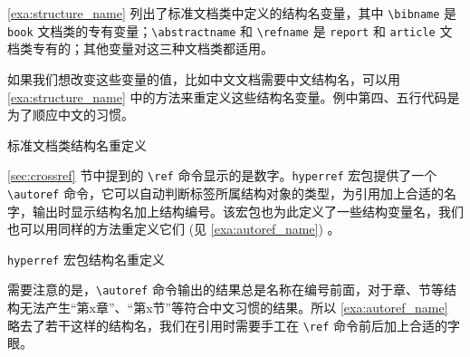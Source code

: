\autoref{exa:structure_name} 列出了标准文档类中定义的结构名变量，其中 \verb|\bibname| 是 \texttt{book} 文档类的专有变量；\verb|\abstractname| 和 \verb|\refname| 是 \texttt{report} 和 \texttt{article} 文档类专有的；其他变量对这三种文档类都适用。

如果我们想改变这些变量的值，比如中文文档需要中文结构名，可以用 \autoref{exa:structure_name} 中的方法来重定义这些结构名变量。例中第四、五行代码是为了顺应中文的习惯。

\begin{example}[htbp]
\begin{Code}[]
\renewcommand{\contentsname}{`目录`}
\renewcommand{\listfigurename}{`图目录`}
\renewcommand{\listtablename}{`表目录`}
\renewcommand{\partname}{`第` \thepart `部分`}
\renewcommand{\chaptername}{`第` \thechapter `章`}
\renewcommand{\figurename}{`图`}
\renewcommand{\tablename}{`表`}
\renewcommand{\bibname}{`参考文献`}
\renewcommand{\appendixname}{`附录`}
\renewcommand{\indexname}{`索引`}
\renewcommand{\abstractname}{`摘要`}
\renewcommand{\refname}{`参考文献`}
\end{Code}
\caption{标准文档类结构名重定义}
\label{exa:structure_name}
\end{example}

\ref{sec:crossref} 节中提到的 \verb|\ref| 命令显示的是数字。\texttt{hyperref} 宏包提供了一个 \verb|\autoref| 命令，它可以自动判断标签所属结构对象的类型，为引用加上合适的名字，输出时显示结构名加上结构编号。该宏包也为此定义了一些结构变量名，我们也可以用同样的方法重定义它们 (见 \autoref{exa:autoref_name}) 。

\begin{example}[htbp]
\begin{Code}[]
\renewcommand{\equationautorefname}{`公式`}
\renewcommand{\footnoteautorefname}{`脚注`}
\renewcommand{\itemautorefname}{`项`}
\renewcommand{\figureautorefname}{`图`}
\renewcommand{\tableautorefname}{`表`}
\renewcommand{\appendixautorefname}{`附录`}
\renewcommand{\theoremautorefname}{`定理`}
\end{Code}
\caption{\texttt{hyperref} 宏包结构名重定义}
\label{exa:autoref_name}
\end{example}

需要注意的是，\verb|\autoref| 命令输出的结果总是名称在编号前面，对于章、节等结构无法产生“第x章”、“第x节”等符合中文习惯的结果。所以 \autoref{exa:autoref_name} 略去了若干这样的结构名，我们在引用时需要手工在 \verb|\ref| 命令前后加上合适的字眼。




